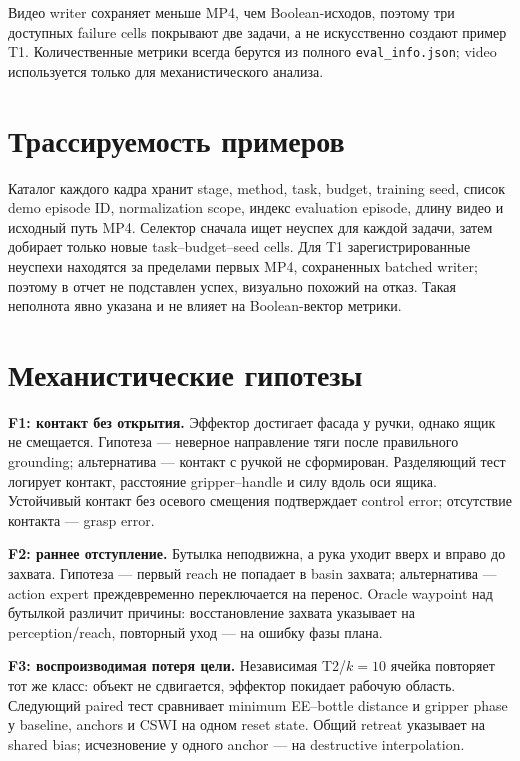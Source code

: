 \documentclass[10pt,twocolumn]{article}
\newcommand{\code}[1]{\texttt{#1}}
\begin{document}
Видео writer сохраняет меньше MP4, чем Boolean-исходов, поэтому три доступных failure cells покрывают
две задачи, а не искусственно создают пример T1. Количественные метрики всегда берутся из полного
\code{eval\_info.json}; video используется только для механистического анализа.

\section{Трассируемость примеров}

Каталог каждого кадра хранит stage, method, task, budget, training seed, список demo episode ID,
normalization scope, индекс evaluation episode, длину видео и исходный путь MP4. Селектор сначала
ищет неуспех для каждой задачи, затем добирает только новые task--budget--seed cells. Для T1
зарегистрированные неуспехи находятся за пределами первых MP4, сохраненных batched writer; поэтому
в отчет не подставлен успех, визуально похожий на отказ. Такая неполнота явно указана и не влияет на
Boolean-вектор метрики.

\newpage
\section{Механистические гипотезы}

\textbf{F1: контакт без открытия.} Эффектор достигает фасада у ручки, однако ящик не смещается.
Гипотеза --- неверное направление тяги после правильного grounding; альтернатива --- контакт с
ручкой не сформирован. Разделяющий тест логирует контакт, расстояние gripper--handle и силу вдоль оси
ящика. Устойчивый контакт без осевого смещения подтверждает control error; отсутствие контакта ---
grasp error.

\textbf{F2: раннее отступление.} Бутылка неподвижна, а рука уходит вверх и вправо до захвата.
Гипотеза --- первый reach не попадает в basin захвата; альтернатива --- action expert преждевременно
переключается на перенос. Oracle waypoint над бутылкой различит причины: восстановление захвата
указывает на perception/reach, повторный уход --- на ошибку фазы плана.

\textbf{F3: воспроизводимая потеря цели.} Независимая T2/$k=10$ ячейка повторяет тот же класс: объект
не сдвигается, эффектор покидает рабочую область. Следующий paired тест сравнивает minimum
EE--bottle distance и gripper phase у baseline, anchors и CSWI на одном reset state. Общий retreat
указывает на shared bias; исчезновение у одного anchor --- на destructive interpolation.
\end{document}
